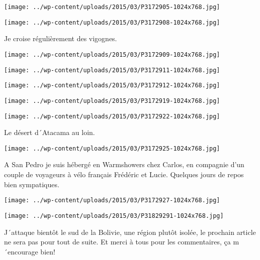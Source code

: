 \centerline{\texttt{[image: ../wp-content/uploads/2015/03/P3172905-1024x768.jpg]} } 
 \newline
 \newline
\centerline{\texttt{[image: ../wp-content/uploads/2015/03/P3172908-1024x768.jpg]} } 
 \newline
 Je croise régulièrement des vigognes.\newline
\centerline{\texttt{[image: ../wp-content/uploads/2015/03/P3172909-1024x768.jpg]} } 
 \newline
 \newline
\centerline{\texttt{[image: ../wp-content/uploads/2015/03/P3172911-1024x768.jpg]} } 
 \newline
 \newline
\centerline{\texttt{[image: ../wp-content/uploads/2015/03/P3172912-1024x768.jpg]} } 
 \newline
 \newline
\centerline{\texttt{[image: ../wp-content/uploads/2015/03/P3172919-1024x768.jpg]} } 
 \newline
 \newline
\centerline{\texttt{[image: ../wp-content/uploads/2015/03/P3172922-1024x768.jpg]} } 
 \newline
 Le désert d´Atacama au loin. \newline
 \newline
\centerline{\texttt{[image: ../wp-content/uploads/2015/03/P3172925-1024x768.jpg]} } 
 \newline
 A San Pedro je suis hébergé en Warmshowers chez Carlos, en compagnie d'un couple de voyageurs à vélo français Frédéric et Lucie. Quelques jours de repos bien sympatiques. \newline
 \newline
\centerline{\texttt{[image: ../wp-content/uploads/2015/03/P3172927-1024x768.jpg]} } 
 \newline
 \newline
\centerline{\texttt{[image: ../wp-content/uploads/2015/03/P31829291-1024x768.jpg]} } 
J´attaque bientôt le sud de la Bolivie, une région plutôt isolée, le prochain article ne sera pas pour tout de suite. \newline
 Et merci à tous pour les commentaires, ça m´encourage bien! \newline
  \newline

\newpage
 

